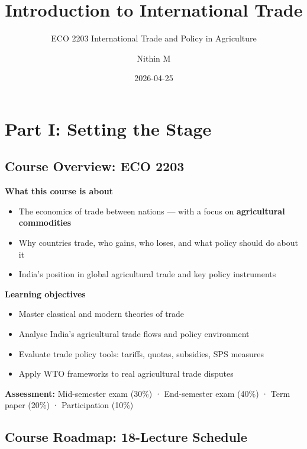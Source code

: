\documentclass[
  letterpaper,
  DIV=11,
  numbers=noendperiod]{scrartcl}
\title{Introduction to International Trade}
\subtitle{ECO 2203 \textbar{} International Trade and Policy in
Agriculture}
\author{Nithin M}
\date{2026-04-25}
\providecommand{\tightlist}{%
  \setlength{\itemsep}{0pt}\setlength{\parskip}{0pt}}
\begin{document}
\maketitle


\section{Part I: Setting the Stage}\label{part-i-setting-the-stage}

\subsection{Course Overview: ECO 2203}\label{course-overview-eco-2203}

\textbf{What this course is about}

\begin{itemize}
\tightlist
\item
  The economics of trade between nations --- with a focus on
  \textbf{agricultural commodities}
\item
  Why countries trade, who gains, who loses, and what policy should do
  about it
\item
  India's position in global agricultural trade and key policy
  instruments
\end{itemize}

\textbf{Learning objectives}

\begin{itemize}
\tightlist
\item
  Master classical and modern theories of trade
\item
  Analyse India's agricultural trade flows and policy environment
\item
  Evaluate trade policy tools: tariffs, quotas, subsidies, SPS measures
\item
  Apply WTO frameworks to real agricultural trade disputes
\end{itemize}

\textbf{Assessment:} Mid-semester exam (30\%) · End-semester exam (40\%)
· Term paper (20\%) · Participation (10\%)

\subsection{Course Roadmap: 18-Lecture
Schedule}\label{course-roadmap-18-lecture-schedule}
\end{document}
